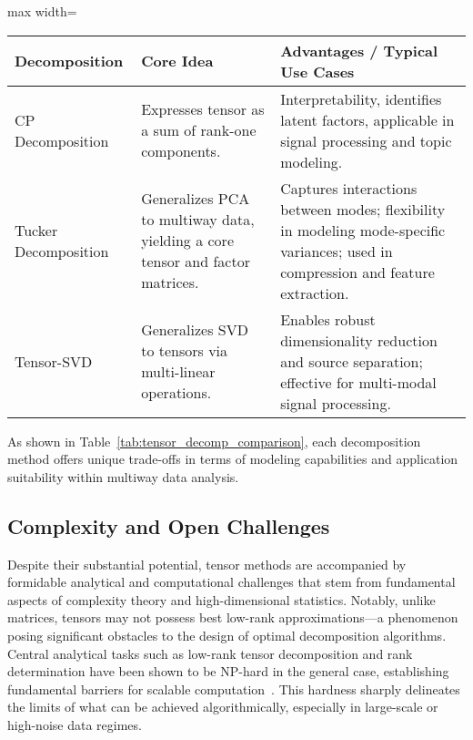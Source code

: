 \documentclass[sigconf]{acmart}
\begin{document}
\begin{table*}[htbp]
\centering
\caption{Comparison of Core Tensor Decomposition Techniques}
\label{tab:tensor_decomp_comparison}
\begin{adjustbox}{max width=\textwidth}
\begin{tabular}{lll}
\toprule
\textbf{Decomposition} & \textbf{Core Idea} & \textbf{Advantages / Typical Use Cases} \\
\midrule
CP Decomposition & Expresses tensor as a sum of rank-one components. & Interpretability, identifies latent factors, applicable in signal processing and topic modeling. \\
Tucker Decomposition & Generalizes PCA to multiway data, yielding a core tensor and factor matrices. & Captures interactions between modes; flexibility in modeling mode-specific variances; used in compression and feature extraction. \\
Tensor-SVD & Generalizes SVD to tensors via multi-linear operations. & Enables robust dimensionality reduction and source separation; effective for multi-modal signal processing. \\
\bottomrule
\end{tabular}
\end{adjustbox}
\end{table*}

As shown in Table~\ref{tab:tensor_decomp_comparison}, each decomposition method offers unique trade-offs in terms of modeling capabilities and application suitability within multiway data analysis.

\subsection{Complexity and Open Challenges}

Despite their substantial potential, tensor methods are accompanied by formidable analytical and computational challenges that stem from fundamental aspects of complexity theory and high-dimensional statistics. Notably, unlike matrices, tensors may not possess best low-rank approximations—a phenomenon posing significant obstacles to the design of optimal decomposition algorithms. Central analytical tasks such as low-rank tensor decomposition and rank determination have been shown to be NP-hard in the general case, establishing fundamental barriers for scalable computation~\cite{ref104}. This hardness sharply delineates the limits of what can be achieved algorithmically, especially in large-scale or high-noise data regimes.
\end{document}
